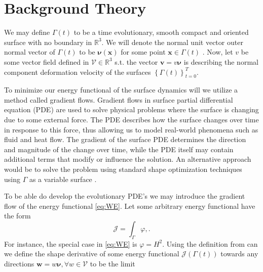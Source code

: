 

\section{Background Theory}%
\label{sec:differential_geometry}

We may define $\Gamma \left( t \right) $ to be a time evolutionary, smooth compact and oriented surface with no boundary in $\mathbb{R} ^{3}$. We will denote the normal unit vector outer normal vector of $\Gamma \left( t \right) $  to be  $
\boldsymbol{\nu} \left( \mathbf{x} \right) $ for some point $\mathbf{x} \in \Gamma \left( t \right)   $ .  Now, let $v$ be some vector field defined in
$\mathcal{V} \in  \mathbb{R}^{3}  $ s.t. the vector $\mathbf{v} = v \boldsymbol{\nu } $  is describing the normal component deformation velocity of the surfaces $\left\{ \Gamma \left( t \right)  \right\}_{t=0}^{T} $.


To minimize our energy functional of the surface dynamics will we utilize a method called gradient flows. Gradient flows in surface partial differential equation (PDE) are used to solve physical problems where the surface is changing due to some external force. The PDE describes how the surface changes over time in response to this force, thus allowing us to model real-world phenomena such as fluid and heat flow. The gradient of the surface PDE determines the direction and magnitude of the change over time, while the PDE itself may contain additional terms that modify or influence the solution. \cite{dogan2007discrete} An alternative approach would be to solve the problem using standard shape optimization techniques using $\Gamma$ as a variable surface \cite{dalphin2014study}.

To be able do develop the evolutionary PDE's we may introduce the gradient flow of the energy functional \eqref{eq:WE}. Let some arbitrary energy functional have the form
\[
\mathcal{J} = \int_{\Gamma }^{} \varphi,.
\]
For instance, the special case in \eqref{eq:WE} is $\varphi = H ^2$.
Using the definition from \cite{bonito2010parametric, troltzsch2010optimal} can we define the shape derivative of some energy
functional $\mathcal{J} \left( \Gamma \left( t \right)  \right)  $ towards any directions $\mathbf{w} = w\boldsymbol{\nu }, \forall w \in \mathcal{V}  $  to be the limit

